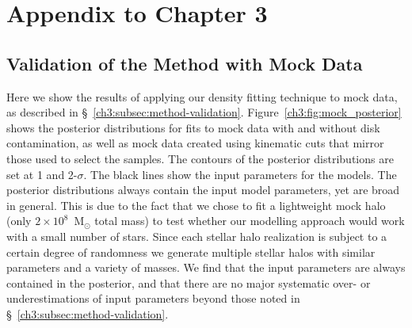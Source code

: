 \chapter{Appendix to Chapter 3}

\section{Validation of the Method with Mock Data}
\label{ch3:ap:mock-data}

Here we show the results of applying our density fitting technique to mock data, as described in \S~\ref{ch3:subsec:method-validation}. Figure~\ref{ch3:fig:mock_posterior} shows the posterior distributions for fits to mock data with and without disk contamination, as well as mock data created using kinematic cuts that mirror those used to select the \gse samples. The contours of the posterior distributions are set at 1 and 2-$\sigma$. The black lines show the input parameters for the models. The posterior distributions always contain the input model parameters, yet are broad in general. This is due to the fact that we chose to fit a lightweight mock halo (only $2\times10^{8}$~M$_{\odot}$ total mass) to test whether our modelling approach would work with a small number of stars. Since each stellar halo realization is subject to a certain degree of randomness we generate multiple stellar halos with similar parameters and a variety of masses. We find that the input parameters are always contained in the posterior, and that there are no major systematic over- or underestimations of input parameters beyond those noted in \S~\ref{ch3:subsec:method-validation}.

